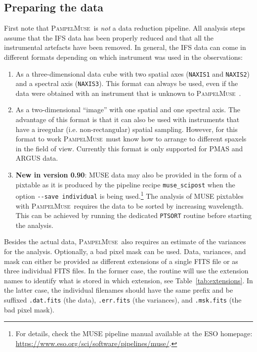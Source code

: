 \documentclass[a4paper,10pt]{article}
\newcommand{\pampelmuse}{\textsc{PampelMuse}\ }
\begin{document}
\subsection{Preparing the data}
\label{sec:data:preparation}
First note that \pampelmuse is \emph{not} a data reduction pipeline. All analysis steps assume that the IFS data has been properly reduced and that all the instrumental artefacts have been removed.
In general, the IFS data can come in different formats depending on which instrument was used in the observations:
\begin{enumerate}
 \item As a three-dimensional data cube with two spatial axes (\texttt{NAXIS1} and \texttt{NAXIS2}) and a spectral axis (\texttt{NAXIS3}). This format can always be used, even if the data were obtained with an instrument that is unknown to \pampelmuse.
 \item As a two-dimensional ``image'' with one spatial and one spectral axis. The advantage of this format is that it can also be used with instruments that have a ireegular (i.e. non-rectangular) spatial sampling. However, for this format to work \pampelmuse must know how to arrange to different spaxels in the field of view. Currently this format is only supported for PMAS and ARGUS data.
 \item \textbf{New in version 0.90}: MUSE data may also be provided in the form of a pixtable as it is produced by the pipeline recipe \texttt{muse\_scipost} when the option \texttt{-{}-save individual} is being used.\footnote{For details, check the MUSE pipeline manual available at the ESO homepage: \url{https://www.eso.org/sci/software/pipelines/muse/}.} The analysis of MUSE pixtables with \pampelmuse requires the data to be sorted by increasing wavelength. This can be achieved by running the dedicated \texttt{PTSORT} routine before starting the analysis.
\end{enumerate}

Besides the actual data, \pampelmuse also requires an estimate of the variances for the analysis. Optionally, a bad pixel mask can be used. Data, variances, and mask can either be provided as different extensions of a single FITS file or as three individual FITS files. In the former case, the routine will use the extension names to identify what is stored in which extension, see Table~\ref{tab:extensions}. In the latter case, the individual filenames should have the same prefix and be suffixed \texttt{.dat.fits} (the data), \texttt{.err.fits} (the variances), and \texttt{.msk.fits} (the bad pixel mask).
\end{document}
